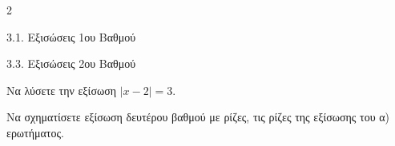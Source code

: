 \begin{ylh}{2}
    \item 3.1. Εξισώσεις 1ου Βαθμού
    \item 3.3. Εξισώσεις 2ου Βαθμού
\end{ylh}

\begin{alist}
\item Να λύσετε την εξίσωση $|x - 2| = 3$.
\item Να σχηματίσετε εξίσωση δευτέρου βαθμού με ρίζες, τις ρίζες της εξίσωσης του α) ερωτήματος.
\end{alist}

